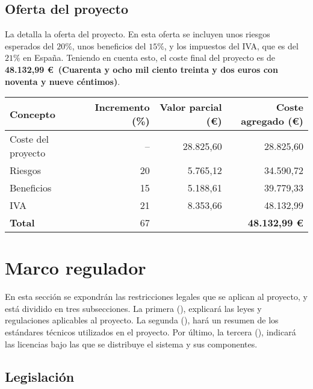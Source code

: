 \subsection{Oferta del proyecto}\label{subsec:offer}

La  detalla la oferta del proyecto. En esta oferta se
incluyen unos riesgos esperados del $20 \%$, unos beneficios del $15 \%$, y los
impuestos del IVA, que es del $21 \%$ en España. Teniendo en cuenta esto, el
coste final del proyecto es de \textbf{48.132,99 \euro~(Cuarenta y ocho mil
ciento treinta y dos euros con noventa y nueve céntimos)}.

\begin{table}[htb]
    {
      \begin{tabular}{lrrr}
        \toprule
        \textbf{Concepto} & \textbf{Incremento (\%)} & \textbf{Valor parcial (\euro)} & \textbf{Coste agregado (\euro)} \\
        \midrule
        Coste del proyecto & -- & 28.825,60 & 28.825,60 \\
        Riesgos            & 20 &  5.765,12 & 34.590,72 \\
        Beneficios         & 15 &  5.188,61 & 39.779,33 \\
        IVA                & 21 &  8.353,66 & 48.132,99 \\
        \midrule
        \textbf{Total}     & 67 &           & \textbf{48.132,99 \euro} \\
        \bottomrule
      \end{tabular}
    }
\end{table}

\section{Marco regulador}\label{sec:regulation}

En esta sección se expondrán las restricciones legales que se aplican al
proyecto, y está dividido en tres subsecciones. La primera
(), explicará las leyes y regulaciones aplicables al
proyecto. La segunda (), hará un resumen de los
estándares técnicos utilizados en el proyecto. Por último, la tercera
(), indicará las licencias bajo las que se distribuye el
sistema y sus componentes.

\subsection{Legislación}\label{subsec:legislation}


